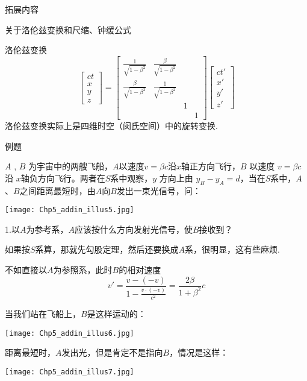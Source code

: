 \documentclass[a4paper, opensource]{./template/qyxf-book}
\begin{document}
\begin{section}{拓展内容}
\begin{subsection}{关于洛伦兹变换和尺缩、钟缓公式}
\begin{multicols}{2}
\end{multicols}
洛伦兹变换
\begin{equation*}
\begin{bmatrix}
ct\\x\\y\\z
\end{bmatrix}
=
\begin{bmatrix}
\frac{1}{\sqrt{1-\beta^2}}&\frac{\beta}{\sqrt{1-\beta^2}}\\
\frac{\beta}{\sqrt{1-\beta^2}}&\frac{1}{\sqrt{1-\beta^2}}\\
&&1\\
&&&1
\end{bmatrix}
\begin{bmatrix}
ct'\\x'\\y'\\z'
\end{bmatrix}
\end{equation*}
洛伦兹变换实际上是四维时空（闵氏空间）中的旋转变换.
\end{subsection}

\begin{subsection}{例题}
\begin{multicols}{2}
$A$ , $B$ 为宇宙中的两艘飞船，$A$以速度$v=\beta c$沿$x$轴正方向飞行，$B$ 以速度 $v=\beta c$ 沿 $x$轴负方向飞行。两者在$S$系中观察，$y$ 方向上由 $y_B-y_A=d$，当在$S$系中，$A$、$B$之间距离最短时，由$A$向$B$发出一束光信号，问：

\hspace{3em}\texttt{[image: Chp5\_addin\_illus5.jpg]}
\end{multicols}
1.以$A$为参考系，$A$应该按什么方向发射光信号，使$B$接收到？

\analysis 如果按$S$系算，那就先勾股定理，然后还要换成$A$系，很明显，这有些麻烦.

不如直接以$A$为参照系，此时$B$的相对速度
\begin{equation*}
v'=\frac{v-(-v)}{1-\frac{v\cdot(-v)}{c^2}}=\frac{2\beta}{1+\beta^2}c
\end{equation*}

当我们站在飞船上，$B$是这样运动的：

\hspace{17em}\texttt{[image: Chp5\_addin\_illus6.jpg]}

距离最短时，$A$发出光，但是肯定不是指向$B$，情况是这样：

\hspace{17em}\texttt{[image: Chp5\_addin\_illus7.jpg]}


\end{subsection}
\end{section}
\end{document}
